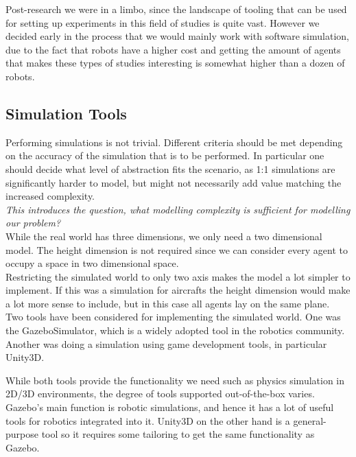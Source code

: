 Post-research we were in a limbo, since the landscape of tooling that can be used for setting up experiments in this field of studies is  quite  vast.
However we decided early in the process that we would mainly work with software simulation, due to the fact that robots have a higher cost and getting the amount of agents that makes these types of studies interesting is somewhat higher than a dozen of robots.

\subsection{Simulation Tools}
Performing simulations is not trivial. Different criteria should be met depending on the accuracy of the simulation that is to be performed.
In particular one should decide what level of abstraction fits the scenario, as 1:1 simulations are significantly harder to model, but might not necessarily add value matching the increased complexity.\\

\textit{This introduces the question, what modelling complexity is sufficient for modelling our problem?}\\

While the real world has three dimensions, we only need a two dimensional model.
The height dimension is not required since we can consider every agent to occupy a space in two dimensional space.\\
Restricting the simulated world to only two axis makes the model a lot simpler to implement.
If this was a simulation for aircrafts the height dimension would make a lot more sense to include,
but in this case all agents lay on the same plane.\\

Two tools have been considered for implementing the simulated world. One was the GazeboSimulator, which is a widely adopted tool in the robotics community.
Another was doing a simulation using game development tools, in particular Unity3D.

While both tools provide the functionality we need such as physics simulation in 2D/3D  environments, the degree of tools supported out-of-the-box varies.
Gazebo's main function is robotic simulations, and hence it has a lot of useful tools for robotics integrated into it.
Unity3D on the other hand is a general-purpose tool so it requires some tailoring to get the same functionality as Gazebo.

